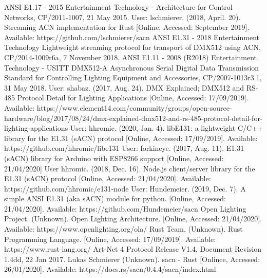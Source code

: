 \documentclass[11pt,a4paper]{article}
\begin{document}
\begin{thebibliography}{9}
	ANSI E1.17 - 2015 Entertainment Technology - Architecture for Control Networks, CP/2011-1007, 21 May 2015.
	User: lschmierer. (2018, April. 20). Streaming ACN implementation for Rust [Online, Accessed: September 2019]. Available: https://github.com/lschmierer/sacn
	ANSI E1.31 - 2018 Entertainment Technology Lightweight streaming protocol for transport of DMX512 using ACN, CP/2014-1009r6a, 7 November 2018.
	ANSI E1.11 - 2008 (R2018) Entertainment Technology - USITT DMX512-A  Asynchronous Serial Digital Data Transmission Standard for Controlling Lighting Equipment and Accessories, CP/2007-1013r3.1, 31 May 2018.
	User: shabaz. (2017, Aug. 24). DMX Explained; DMX512 and RS-485 Protocol Detail for Lighting Applications [Online, Accessed: 17/09/2019]. Available: https://www.element14.com/community/groups/open-source-hardware/blog/2017/08/24/dmx-explained-dmx512-and-rs-485-protocol-detail-for-lighting-applications
	User: hhromic. (2020, Jan. 4). libE131: a lightweight C/C++ library for the E1.31 (sACN) protocol [Online, Accessed: 17/09/2019]. Available: https://github.com/hhromic/libe131
	User: forkineye. (2017, Aug. 11). E1.31 (sACN) library for Arduino with ESP8266 support [Online, Accessed: 21/04/2020]
	User hhromic. (2018, Dec. 16). Node.js client/server library for the E1.31 (sACN) protocol [Online, Accessed: 21/04/2020]. Available: https://github.com/hhromic/e131-node
	User: Hundemeier. (2019, Dec. 7). A simple ANSI E1.31 (aka sACN) module for python. [Online, Accessed: 21/04/2020]. Available: https://github.com/Hundemeier/sacn
	Open Lighting Project. (Unknown). Open Lighting Architecture. [Online, Accessed: 21/04/2020]. Available: https://www.openlighting.org/ola/
	Rust Team. (Unknown). Rust Programming Language. [Online, Accessed: 17/09/2019]. Available: https://www.rust-lang.org/
	Art-Net 4 Protocol Release V1.4, Document Revision 1.4dd, 22 Jan 2017.
	Lukas Schmierer (Unknown). sacn - Rust [Onlinee, Accessed: 26/01/2020]. Available: https://docs.rs/sacn/0.4.4/sacn/index.html
	

\end{thebibliography}
\end{document}
